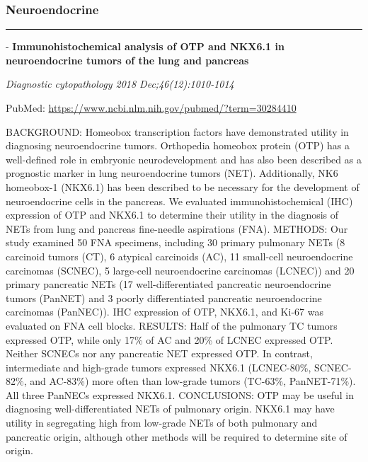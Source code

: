 \documentclass[]{article}
\begin{document}
\hypertarget{neuroendocrine-1}{%
\subsubsection{Neuroendocrine}\label{neuroendocrine-1}}

\begin{center}\rule{0.5\linewidth}{\linethickness}\end{center}

 - \textbf{Immunohistochemical analysis of OTP and NKX6.1 in
neuroendocrine tumors of the lung and pancreas}

\emph{Diagnostic cytopathology 2018 Dec;46(12):1010-1014}

PubMed: \url{https://www.ncbi.nlm.nih.gov/pubmed/?term=30284410}

BACKGROUND: Homeobox transcription factors have demonstrated utility in
diagnosing neuroendocrine tumors. Orthopedia homeobox protein (OTP) has
a well-defined role in embryonic neurodevelopment and has also been
described as a prognostic marker in lung neuroendocrine tumors (NET).
Additionally, NK6 homeobox-1 (NKX6.1) has been described to be necessary
for the development of neuroendocrine cells in the pancreas. We
evaluated immunohistochemical (IHC) expression of OTP and NKX6.1 to
determine their utility in the diagnosis of NETs from lung and pancreas
fine-needle aspirations (FNA). METHODS: Our study examined 50 FNA
specimens, including 30 primary pulmonary NETs (8 carcinoid tumors (CT),
6 atypical carcinoids (AC), 11 small-cell neuroendocrine carcinomas
(SCNEC), 5 large-cell neuroendocrine carcinomas (LCNEC)) and 20 primary
pancreatic NETs (17 well-differentiated pancreatic neuroendocrine tumors
(PanNET) and 3 poorly differentiated pancreatic neuroendocrine
carcinomas (PanNEC)). IHC expression of OTP, NKX6.1, and Ki-67 was
evaluated on FNA cell blocks. RESULTS: Half of the pulmonary TC tumors
expressed OTP, while only 17\% of AC and 20\% of LCNEC expressed OTP.
Neither SCNECs nor any pancreatic NET expressed OTP. In contrast,
intermediate and high-grade tumors expressed NKX6.1 (LCNEC-80\%,
SCNEC-82\%, and AC-83\%) more often than low-grade tumors (TC-63\%,
PanNET-71\%). All three PanNECs expressed NKX6.1. CONCLUSIONS: OTP may
be useful in diagnosing well-differentiated NETs of pulmonary origin.
NKX6.1 may have utility in segregating high from low-grade NETs of both
pulmonary and pancreatic origin, although other methods will be required
to determine site of origin.

{}
\end{document}
